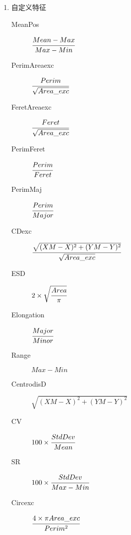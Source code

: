 \begin{enumerate}
\begin{enumerate}
\begin{description}
    \item[Mean] 物体内的平均灰度值，物体中所有像素点的灰度值的总和除以总的像素个数。
    \item[Range] $Max-Min$ 极差，灰度的范围。    
    \item[CV] $100 \times \cfrac{StdDev}{Mean}$ 变异系数（也称离散系数或相对偏差），是灰度标准偏差与平均值之比，用百分数表示。
    \item[SR] $100 \times \cfrac{StdDev}{Max-Min}$ 灰度标准差比上极差。
    \item[Skew] 灰度直方图的偏度，衡量灰度分布的不对称性。正态分布的偏度为0，概率密度函数两侧的尾部长度互相对称。偏度为负表示概率密度函数左侧的尾部相对于右侧要长，大部分的值位于平均值的右侧。偏度为正表示概率密度函数右侧的尾部比左侧的长，即处于平均值左侧的值要比右侧多。
    \item[Kurt] 峰度，描述灰度直方图的陡缓程度。 
    \item[Mean\_exc] 物体内部去掉空洞后的平均灰度值（$Mean\_exc = IntDen / Area\_exc$）。
    \item[Median] 物体内像素的灰度值的中值。
    \item[StdDev] 物体内像素的灰度值的标准差。
    \item[Mode] 表示灰度的众数。
\end{description}

\item 自定义特征
\begin{description}
    \item[MeanPos] $\cfrac{Mean-Max}{Max-Min}$
    \item[PerimAreaexc] $\cfrac{Perim}{\sqrt{Area\_exc}}$ 
    \item[FeretAreaexc] $\cfrac{Feret}{\sqrt{Area\_exc}}$
    \item[PerimFeret] $\cfrac{Perim}{Feret}$
    \item[PerimMaj] $\cfrac{Perim}{Major}$
    \item[CDexc] $\cfrac{\sqrt{(XM-X)^{2}+(YM-Y)^{2}}}{{\sqrt{Area\_exc}}}$ 
    \item[ESD] $2 \times \sqrt{\cfrac{Area}{\pi}}$
    \item[Elongation] $\cfrac{Major}{Minor}$
    \item[Range] $Max-Min$
    \item[CentrodisD] $\sqrt{(XM-X)^{2}+(YM-Y)^{2}}$
    \item[CV] $100 \times \cfrac{StdDev}{Mean}$
    \item[SR] $100 \times \cfrac{StdDev}{Max-Min}$
    \item[Circexc] $\cfrac{4 \times \pi Area\_exc}{Perim^{2}}$
\end{description}
\end{enumerate}
\end{enumerate}